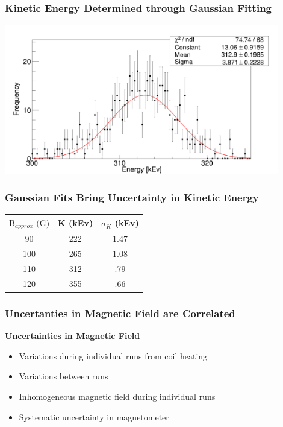 \documentclass{beamer}
\begin{document}
\begin{frame}
  \frametitle{Kinetic Energy Determined through Gaussian Fitting}
  \includegraphics[width=12cm]{gaus.png}
\end{frame}
\begin{frame}
  \frametitle{Gaussian Fits Bring Uncertainty in Kinetic Energy}
  \begin{table}
  \begin{ruledtabular}
    \begin{tabular}{ccc}
      $\text{B}_{approx} \text{ (G)}$ & K (kEv) & $\sigma_K$ (kEv) \\
      \hline
      90 & 222 & 1.47 \\
      100 & 265 & 1.08 \\
      110 & 312 & .79 \\
      120 & 355 & .66 \\
    \end{tabular}
  \end{ruledtabular}
\end{table}
\end{frame}

\begin{frame}
  \frametitle{Uncertanties in Magnetic Field are Correlated}
  \textbf{Uncertainties in Magnetic Field}
\pause
  \begin{itemize}
    \item Variations during individual runs from coil heating
      \pause
    \item Variations between runs
      \pause
    \item Inhomogeneous magnetic field during individual runs
      \pause
    \item Systematic uncertainty in magnetometer
  \end{itemize}
\end{frame}
\end{document}
